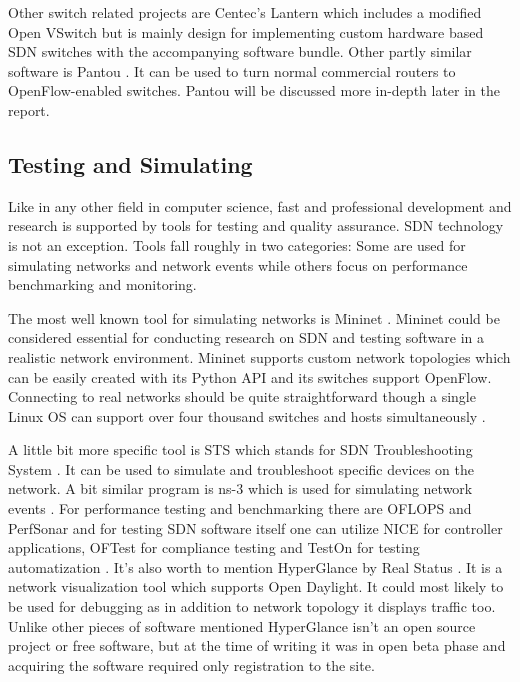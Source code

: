 Other switch related projects are Centec’s Lantern \cite{Lantern} which includes a modified Open VSwitch but is mainly design for implementing custom hardware based SDN switches with the accompanying software bundle. Other partly similar software is Pantou \cite{Yia04}. It can be used to turn normal commercial routers to OpenFlow-enabled switches. Pantou will be discussed more in-depth later in the report.

\subsection{Testing and Simulating}

Like in any other field in computer science, fast and professional development and research is supported by tools for testing and quality assurance. SDN technology is not an exception. Tools fall roughly in two categories: Some are used for simulating networks and network events while others focus on performance benchmarking and monitoring.

The most well known tool for simulating networks is Mininet \cite{MN14}. Mininet could be considered essential for conducting research on SDN and testing software in a realistic network environment. Mininet supports custom network topologies which can be easily created with its Python API and its switches support OpenFlow. Connecting to real networks should be quite straightforward though a single Linux OS can support over four thousand switches and hosts simultaneously \cite{MN14}. 

A little bit more specific tool is STS which stands for SDN Troubleshooting System \cite{STS}. It can be used to simulate and troubleshoot specific devices on the network. A bit similar program is ns-3 which is used for simulating network events \cite{NS3}. For performance testing and benchmarking there are OFLOPS and PerfSonar \cite{OFLOPS, Perf} and for testing SDN software itself one can utilize NICE \cite{NICE} for controller applications, OFTest for compliance testing \cite{OFTest} and TestOn for testing automatization \cite{TestOn}. It’s also worth to mention HyperGlance by Real Status \cite{Hyper}. It is a network visualization tool which supports Open Daylight. It could most likely to be used for debugging as in addition to network topology it displays traffic too. Unlike other pieces of software mentioned HyperGlance isn’t an open source project or free software, but at the time of writing it was in open beta phase and acquiring the software required only registration to the site.


